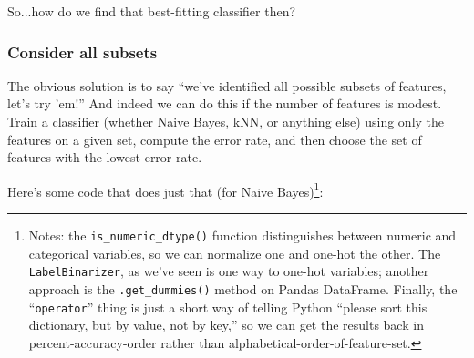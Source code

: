 \documentclass[12pt]{article}
\begin{document}
So...how do we find that best-fitting classifier then?

\subsubsection{Consider all subsets}

The obvious solution is to say ``we've identified all possible subsets of
features, let's try 'em!'' And indeed we can do this if the number of features
is modest. Train a classifier (whether Naive Bayes, kNN, or anything else)
using only the features on a given set, compute the error rate, and then
choose the set of features with the lowest error rate.

Here's some code that does just that (for Naive Bayes)\footnote{Notes: the
\texttt{is\_numeric\_dtype()} function distinguishes between numeric and
categorical variables, so we can normalize one and one-hot the other. The
\texttt{LabelBinarizer}, as we've seen is one way to one-hot variables;
another approach is the \texttt{.get\_dummies()} method on Pandas DataFrame.
Finally, the ``\texttt{operator}'' thing is just a short way of telling Python
``please sort this dictionary, but by value, not by key,'' so we can get the
results back in percent-accuracy-order rather than
alphabetical-order-of-feature-set.}:
\end{document}
